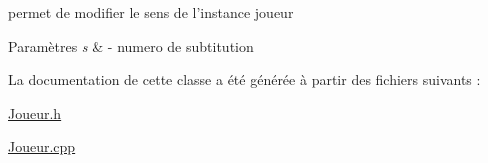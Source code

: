 permet de modifier le sens de l'instance joueur 


\begin{DoxyParams}{\-Paramètres}
{\em s} & -\/ numero de subtitution \\
\hline
\end{DoxyParams}


\-La documentation de cette classe a été générée à partir des fichiers suivants \-:\begin{DoxyCompactItemize}
\item 
\hyperlink{_joueur_8h}{\-Joueur.\-h}\item 
\hyperlink{_joueur_8cpp}{\-Joueur.\-cpp}\end{DoxyCompactItemize}

